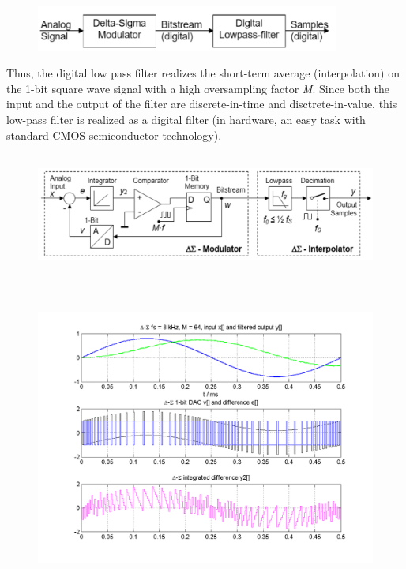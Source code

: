     \begin{figure}[h]
    \centering
    \includegraphics[width=10cm, height=1.5cm]{Images/image178.png}
    \label{fig:Fig 136}
    \end{figure}
    
Thus, the digital low pass filter realizes the short-term average (interpolation) on the 1-bit square wave signal with a high oversampling factor \textit{M}. Since both the input and the output of the filter are discrete-in-time and disctrete-in-value, this low-pass filter is realized as a digital filter (in hardware, an easy task with standard CMOS semiconductor technology).

    \begin{figure}[h]
    \centering
    \includegraphics[width=15cm, height=4cm]{Images/image179.png}
    \label{fig:Fig 137}
    \end{figure}
    
    \begin{figure}[h]
    \centering
    \includegraphics[width=15cm, height=10cm]{Images/image43.png}
    \label{fig:Fig 138}
    \end{figure}

